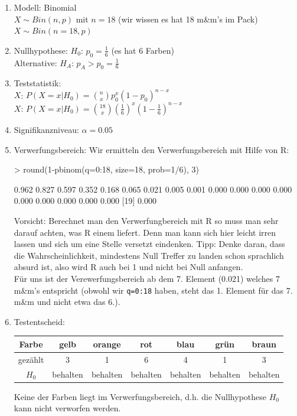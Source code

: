 \begin{enumerate}
	\item Modell: Binomial\\
	$X \sim Bin(n,p)$ mit $n=18$ (wir wissen es hat 18 m\&m's im Pack)\\
	$X \sim Bin(n=18, p)$
	\item Nullhypothese: $H_0$: $p_0 = \frac{1}{6}$ (es hat 6 Farben) \\
	Alternative: $H_A$: $p_A > p_0 = \frac{1}{6}$ 
	\item Teststatistik: \\
	$X$: $P(X=x|H_0)={n \choose x} p_0^x (1-p_0)^{n-x}$ \\
	$X$: $P(X=x|H_0)={18 \choose x} (\frac{1}{6})^x (1-\frac{1}{6})^{n-x}$
	\item Signifikanzniveau: $\alpha=0.05$
	\item Verwerfungsbereich:
	Wir ermitteln den Verwerfungsbereich mit Hilfe von R:
\begin{Schunk}
\begin{Sinput}
> round(1-pbinom(q=0:18, size=18, prob=1/6), 3)
\end{Sinput}
\begin{Soutput}
 [1] 0.962 0.827 0.597 0.352 0.168 0.065 0.021 0.005 0.001 0.000 0.000 0.000 0.000 0.000 0.000 0.000 0.000 0.000
[19] 0.000
\end{Soutput}
\end{Schunk}
	Vorsicht: Berechnet man den Verwerfungbereich mit R so muss man sehr
	darauf achten, was R einem liefert. Denn man kann sich hier leicht 
	irren lassen und sich um eine Stelle versetzt eindenken. Tipp: Denke
	daran, dass die Wahrscheinlichkeit, mindestens Null Treffer zu landen
	schon sprachlich absurd ist, also wird R auch bei 1 und nicht bei Null
	anfangen.\\
	Für uns ist der Verewerfungsbereich ab dem 7. Element (0.021) welches
	7 m\&m's entspricht (obwohl wir \verb!q=0:18! haben, steht das 1. Element
	für das 7. m\&m und nicht etwa das 6.).
	\item Testentscheid:\\
	
	\begin{table}[h!]
	\centering
	\begin{tabular}{c|c|c|c|c|c|c}
	Farbe & gelb & orange & rot & blau & grün & braun \\
	\hline
	gezählt & 3 & 1 & 6 & 4 & 1 & 3 \\
	\hline
	$H_0$ & behalten & behalten & behalten & behalten & behalten & behalten \\ 
	\end{tabular}
	\end{table}

	\noindent
	Keine der Farben liegt im Verwerfungsbereich, d.h. die Nullhypothese
	$H_0$ kann nicht verworfen werden.
\end{enumerate}


